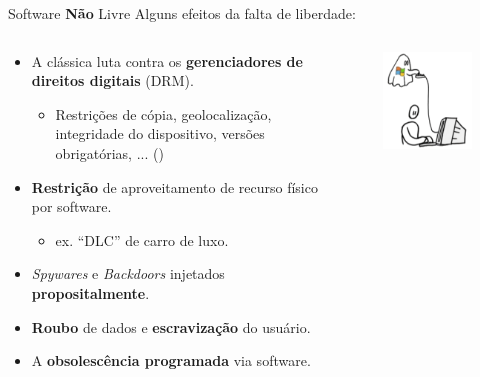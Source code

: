 \documentclass{beamer}
\begin{document}
\begin{frame}{Software \textbf{Não} Livre}
    Alguns efeitos da falta de liberdade:
    \begin{columns}
        \begin{column}{0.8\textwidth}
            \begin{itemize}
                \item A clássica luta contra os \textbf{gerenciadores de direitos digitais} (DRM).
                \begin{itemize}
                    \item Restrições de cópia, geolocalização, integridade do dispositivo, versões obrigatórias, ... (\cite{GNUDRM})
                \end{itemize}
                \item \textbf{Restrição} de aproveitamento de recurso físico por software.
                \begin{itemize}
                    \item ex. ``DLC'' de carro de luxo.
                \end{itemize}
                \item \textit{Spywares} e \textit{Backdoors} injetados \textbf{propositalmente}.
                \item \textbf{Roubo} de dados e \textbf{escravização} do usuário.
                \item A \textbf{obsolescência programada} via software.
            \end{itemize}
        \end{column}
        \begin{column}{0.2\textwidth}
            \begin{figure}
                \centering
                \includegraphics[width=1.2\linewidth]{img/control.png}

\end{figure}
\end{column}
\end{columns}
\end{frame}
\end{document}
